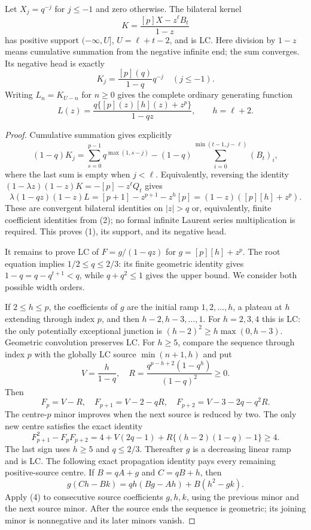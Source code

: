 \begin{lemma}
Let $X_j=q^{-j}$ for $j\le-1$ and zero otherwise. The bilateral
kernel
\[
 K=\frac{[p]X-z^\ell B_t}{1-z}
\]
has positive support $(-\infty,U]$, $U=\ell+t-2$, and is LC.
Here division by $1-z$ means cumulative summation from the negative
infinite end; the sum converges. Its negative head is exactly
\[
 K_j=\frac{[p](q)}{1-q}q^{-j}\quad(j\le-1).
\]
Writing $L_n=K_{U-n}$ for $n\ge0$ gives the complete ordinary
generating function
\[
 L(z)=\frac{q\{[p](z)[h](z)+z^p\}}{1-qz},\qquad h=\ell+2.
 \tag{1}
\]
\end{lemma}
\begin{proof}
Cumulative summation gives explicitly
\[
 (1-q)K_j=\sum_{s=0}^{p-1}q^{\max(1,s-j)}
 -(1-q)\sum_{i=0}^{\min(t-1,j-\ell)}(B_t)_i,
 \tag{2}
\]
where the last sum is empty when $j<\ell$. Equivalently, reversing
the identity
$(1-\lambda z)(1-z)K=-[p]-z^\ell Q_t$ gives
\[
 \lambda(1-qz)(1-z)L=[p+1]-z^{p+1}-z^h[p]
       =(1-z)([p][h]+z^p).
\]
These are convergent bilateral identities on $|z|>q$ or, equivalently,
finite coefficient identities from (2); no formal infinite Laurent
series multiplication is required. This proves (1), its support, and
its negative head.

It remains to prove LC of $F=g/(1-qz)$ for $g=[p][h]+z^p$.
The root equation implies $1/2\le q\le2/3$: its finite geometric
identity gives $1-q=q-q^{t+1}<q$, while $q+q^2\le1$ gives the
upper bound. We consider both possible width orders.

If $2\le h\le p$, the coefficients of $g$ are the initial ramp
$1,2,\ldots,h$, a plateau at $h$ extending through index $p$,
and then $h-2,h-3,\ldots,1$. For $h=2,3,4$ this is LC:
the only potentially exceptional junction is
$(h-2)^2\ge h\max(0,h-3)$. Geometric convolution preserves LC.
For $h\ge5$, compare the sequence through index $p$ with the
globally LC source $\min(n+1,h)$ and put
\[
 V=\frac h{1-q},\quad
 R=\frac{q^{p-h+2}(1-q^h)}{(1-q)^2}\ge0.
\]
Then
\[
 F_p=V-R,\quad F_{p+1}=V-2-qR,\quad
 F_{p+2}=V-3-2q-q^2R.
\]
The centre-$p$ minor improves when the next source is reduced by
two. The only new centre satisfies the exact identity
\[
 F_{p+1}^2-F_pF_{p+2}
 =4+V(2q-1)+R\{(h-2)(1-q)-1\}\ge4.
 \tag{3}
\]
The last sign uses $h\ge5$ and $q\le2/3$. Thereafter $g$ is a
decreasing linear ramp and is LC. The following exact propagation
identity pays every remaining positive-source centre. If
$B=qA+g$ and $C=qB+h$, then
\[
 g(Ch-Bk)=qh(Bg-Ah)+B(h^2-gk).                 \tag{4}
\]
Apply (4) to consecutive source coefficients $g,h,k$, using the
previous minor and the next source minor. After the source ends
the sequence is geometric; its joining minor is nonnegative and
its later minors vanish.


\end{proof}
